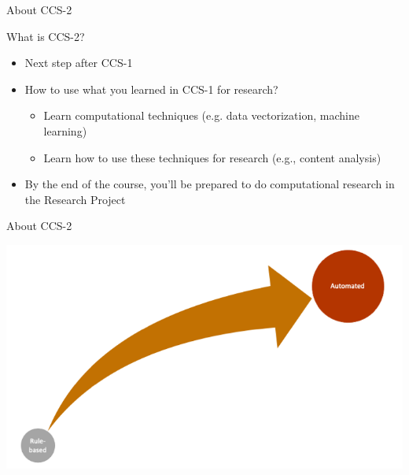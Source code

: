 \documentclass[handout]{beamer}
\begin{document}
\begin{frame}{About CCS-2} 

What is CCS-2?
	\begin{itemize}
		\item Next step after CCS-1 %
		\item How to use what you learned in CCS-1 for research?
		\begin{itemize}
			\item Learn computational techniques (e.g. data vectorization, machine learning)
			\item Learn how to use these techniques for research (e.g., content analysis)
		\end{itemize}
		\item By the end of the course, you'll be prepared to do computational research in the Research Project
	\end{itemize}
	
\end{frame}


\begin{frame}{About CCS-2}
	
	\begin{center}
		\includegraphics[width=\linewidth,height=\textheight,keepaspectratio]{../pictures/Roadmap.png} 
	\end{center}
	
\end{frame}
\end{document}
